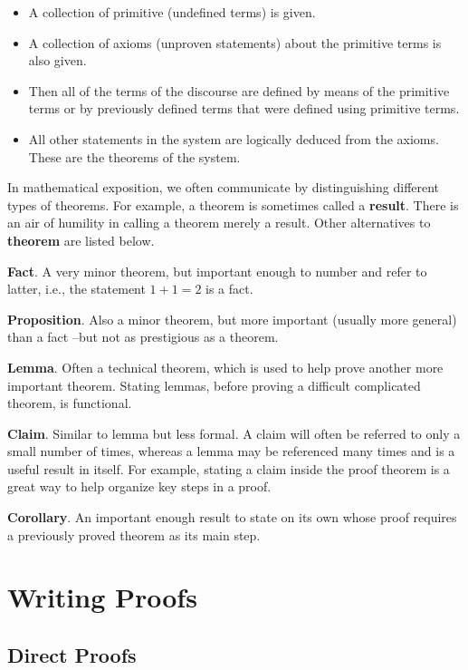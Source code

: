 \documentclass[
  letterpaper,
  10pt,
  reqno,
  twopage,
  openany]{book}
\providecommand{\tightlist}{%
  \setlength{\itemsep}{0pt}\setlength{\parskip}{0pt}}\usepackage{longtable,booktabs,array}
\theoremstyle{plain}
\theoremstyle{definition}
\theoremstyle{definition}
\theoremstyle{definition}
\theoremstyle{plain}
\theoremstyle{plain}
\theoremstyle{remark}
\begin{document}
\begin{itemize}
\tightlist
\item
  A collection of primitive (undefined terms) is given.
\item
  A collection of axioms (unproven statements) about the primitive terms
  is also given.\\
\item
  Then all of the terms of the discourse are defined by means of the
  primitive terms or by previously defined terms that were defined using
  primitive terms.\\
\item
  All other statements in the system are logically deduced from the
  axioms. These are the theorems of the system.
\end{itemize}

In mathematical exposition, we often communicate by distinguishing
different types of theorems. For example, a theorem is sometimes called
a  \textbf{result}. There is an air of humility in calling
a theorem merely a result. Other alternatives to 
\textbf{theorem} are listed below.

\textbf{Fact}. A very minor theorem, but important enough to number and
refer to latter, i.e., the statement \(1+1=2\) is a fact.

\textbf{Proposition}. Also a minor theorem, but more important (usually
more general) than a fact --but not as prestigious as a theorem.

\textbf{Lemma}. Often a technical theorem, which is used to help prove
another more important theorem. Stating lemmas, before proving a
difficult complicated theorem, is functional.

\textbf{Claim}. Similar to lemma but less formal. A claim will often be
referred to only a small number of times, whereas a lemma may be
referenced many times and is a useful result in itself. For example,
stating a claim inside the proof theorem is a great way to help organize
key steps in a proof.

\textbf{Corollary}. An important enough result to state on its own whose
proof requires a previously proved theorem as its main step.

\hypertarget{writing-proofs}{%
\section{Writing Proofs}\label{writing-proofs}}

\hypertarget{direct-proofs}{%
\subsection{Direct Proofs}\label{direct-proofs}}
\end{document}
